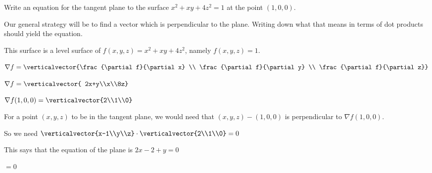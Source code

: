 \documentclass{ximera}
\begin{document}
\begin{question}
	Write an equation for the tangent plane to the surface $x^2+xy+4z^2 = 1$ at the point $(1,0,0)$.
		\begin{solution}
			\begin{hint}
				Our general strategy will be to find a vector which is perpendicular to the plane.  Writing down what that means in terms of dot products should
				yield the equation.
			\end{hint}
			\begin{hint}
				This surface is a level surface of $f(x,y,z) = x^2+xy+4z^2$, namely $f(x,y,z) = 1$.
			\end{hint}
			\begin{hint}
				$\nabla f  = \verticalvector{\frac{\partial f}{\partial x} \\ \frac{\partial f}{\partial y} \\ \frac{\partial f}{\partial z}}$
			\end{hint}
			\begin{hint}
				$\nabla f  =\verticalvector{ 2x+y\\x\\8z}$
			\end{hint}
			\begin{hint}
				$\nabla f (1,0,0) = \verticalvector{2\\1\\0} $
			\end{hint}
			\begin{hint}
				For a point $(x,y,z)$ to be in the tangent plane, we would need that $(x,y,z) - (1,0,0)$ is perpendicular to $\nabla f (1,0,0)$.
			\end{hint}
			\begin{hint}
				So we need $\verticalvector{x-1\\y\\z} \cdot \verticalvector{2\\1\\0} = 0$
			\end{hint}
			\begin{hint}
				This says that the equation of the plane is $2x-2+y=0$
			\end{hint}
			 $= 0$
		\end{solution}
\end{question}
\end{document}
